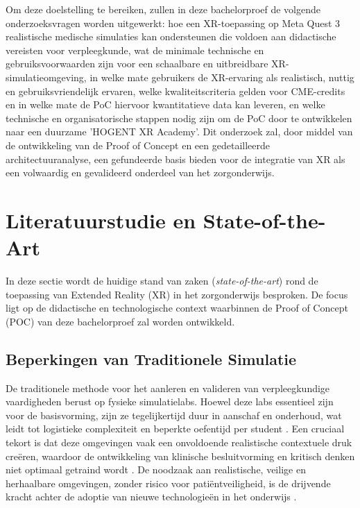 Om deze doelstelling te bereiken, zullen in deze bachelorproef de volgende onderzoeksvragen worden uitgewerkt:
hoe een XR-toepassing op Meta Quest 3 realistische medische simulaties kan ondersteunen die voldoen aan didactische vereisten voor verpleegkunde, wat de minimale technische en gebruiksvoorwaarden zijn voor een schaalbare en uitbreidbare XR-simulatieomgeving, in welke mate gebruikers de XR-ervaring als realistisch, nuttig en gebruiksvriendelijk ervaren, welke kwaliteitscriteria gelden voor CME-credits en in welke mate de PoC hiervoor kwantitatieve data kan leveren, en welke technische en organisatorische stappen nodig zijn om de PoC door te ontwikkelen naar een duurzame 'HOGENT XR Academy'.
Dit onderzoek zal, door middel van de ontwikkeling van de Proof of Concept en een gedetailleerde architectuuranalyse, een gefundeerde basis bieden voor de integratie van XR als een volwaardig en gevalideerd onderdeel van het zorgonderwijs.

\section{Literatuurstudie en State-of-the-Art}%
\label{sec:literatuurstudie}

In deze sectie wordt de huidige stand van zaken (\textit{state-of-the-art}) rond de toepassing van Extended Reality (XR) in het zorgonderwijs besproken. De focus ligt op de didactische en technologische context waarbinnen de Proof of Concept (POC) van deze bachelorproef zal worden ontwikkeld.

\subsection{Beperkingen van Traditionele Simulatie}

De traditionele methode voor het aanleren en valideren van verpleegkundige vaardigheden berust op fysieke simulatielabs. Hoewel deze labs essentieel zijn voor de basisvorming, zijn ze tegelijkertijd duur in aanschaf en onderhoud, wat leidt tot logistieke complexiteit en beperkte oefentijd per student \autocite{Pottle2019}. Een cruciaal tekort is dat deze omgevingen vaak een onvoldoende realistische contextuele druk creëren, waardoor de ontwikkeling van klinische besluitvorming en kritisch denken niet optimaal getraind wordt \autocite{Radianti2020}. De noodzaak aan realistische, veilige en herhaalbare omgevingen, zonder risico voor patiëntveiligheid, is de drijvende kracht achter de adoptie van nieuwe technologieën in het onderwijs \autocite{Lampropoulos2025}.

